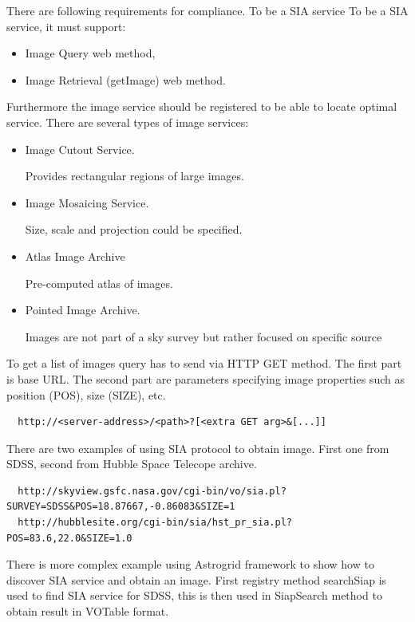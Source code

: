 There are following requirements for compliance. To be a SIA service
To be a SIA service, it must support:

\begin{itemize}
\item Image Query web method,
\item Image Retrieval (getImage) web method.
\end{itemize}

\noindent Furthermore the image service should be registered to be
able to locate optimal service. There are several types of image
services:

\begin{itemize}
\item Image Cutout Service.

  Provides rectangular regions of large images.
\item Image Mosaicing Service.

  Size, scale and projection could be specified.
\item Atlas Image Archive

  Pre-computed atlas of images.
\item Pointed Image Archive.  

  Images are not part of a sky survey but
  rather focused on specific source
\end{itemize}


To get a list of images query has to send via HTTP GET method. The
first part is base URL. The second part are parameters specifying image
properties such as position (POS), size (SIZE), etc.

\begin{lstlisting}
  http://<server-address>/<path>?[<extra GET arg>&[...]]
\end{lstlisting}

There are two examples of using SIA protocol to obtain image. First
one from SDSS, second from Hubble Space Telecope archive. 

\begin{lstlisting}
  http://skyview.gsfc.nasa.gov/cgi-bin/vo/sia.pl?SURVEY=SDSS&POS=18.87667,-0.86083&SIZE=1
  http://hubblesite.org/cgi-bin/sia/hst_pr_sia.pl?POS=83.6,22.0&SIZE=1.0
\end{lstlisting}

There is more complex example using Astrogrid framework to show how to
discover SIA service and obtain an image. First registry method
searchSiap is used to find SIA service for SDSS, this is then used in
SiapSearch method to obtain result in VOTable format.  

